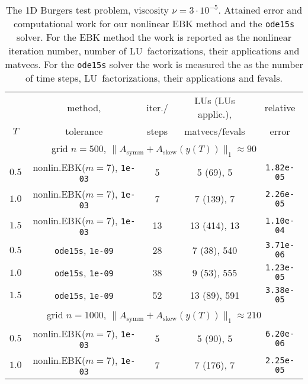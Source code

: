 \documentclass[sn-aps]{sn-jnl}
\theoremstyle{thmstyleone}%
\theoremstyle{thmstyletwo}%
\theoremstyle{thmstylethree}%
\newcommand{\Asymm}{A_{\mathrm{symm}}}
\newcommand{\Askew}{A_{\mathrm{skew}}}
\begin{document}
\begin{table}
\caption{The 1D Burgers test problem, viscosity $\nu = 3\cdot 10^{-5}$.  
Attained error and computational work for our nonlinear EBK method and 
the \texttt{ode15s} solver. 
For the EBK method the work is reported as the nonlinear iteration number,
number of LU~factorizations, their applications and matvecs.
For the \texttt{ode15s} solver the work is measured the 
as the number of time steps, LU~factorizations, their applications and fevals.}
\label{t:Brg_mu3e_5}  

%
%
\renewcommand{\arraystretch}{1.1} %
\begin{tabular}{ccccc}
\hline\hline
      &  method,            & iter./& LUs (LUs applic.), & relative\\ 
$T$   & tolerance           & steps & matvecs/fevals     & error \\
\hline
\multicolumn{5}{c}{grid $n=500$, $\|\Asymm  + \Askew (y(T))\|_1\approx 90$}\\
$0.5$  & nonlin.EBK($m=7$), {\tt 1e-03} & 5     & 5 (69),  5         & {\tt 1.82e-05} \\
$1.0$  & nonlin.EBK($m=7$), {\tt 1e-03} & 7     & 7 (139), 7         & {\tt 2.26e-05} \\
$1.5$  & nonlin.EBK($m=7$), {\tt 1e-03} & 13    & 13 (414), 13       & {\tt 1.10e-04} \\
$0.5$  & {\tt ode15s},  {\tt 1e-09}     & 28    & 7 (38), 540        & {\tt 3.71e-06} \\
$1.0$  & {\tt ode15s},  {\tt 1e-09}     & 38    & 9 (53), 555        & {\tt 1.23e-05} \\
$1.5$  & {\tt ode15s},  {\tt 1e-09}     & 52    & 13 (89), 591       & {\tt 3.38e-05} \\
\hline
\multicolumn{5}{c}{grid $n=1000$, $\|\Asymm  + \Askew (y(T))\|_1\approx 210$}\\
$0.5$  & nonlin.EBK($m=7$), {\tt 1e-03} & 5     & 5 (90), 5          & {\tt 6.20e-06} \\
$1.0$  & nonlin.EBK($m=7$), {\tt 1e-03} & 7     & 7 (176), 7         & {\tt 2.25e-05} \\

\end{tabular}
\end{table}
\end{document}
